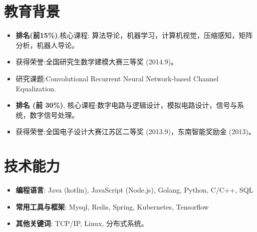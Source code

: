 \documentclass{resume}
\begin{document}
\section{教育背景}
\begin{itemize}
  \item \textbf{排名(前15\%)},核心课程: 算法导论，机器学习，计算机视觉，压缩感知，矩阵分析，机器人导论。
  \item 获得荣誉:全国研究生数学建模大赛三等奖 (2014.9)。
  \item 研究课题:Convolutional Recurrent Neural Network-based Channel Equalization.
\end{itemize}

\begin{itemize}
  \item \textbf{排名 (前 30\%)}, 核心课程:数字电路与逻辑设计，模拟电路设计，信号与系统，数字信号处理。
  \item 获得荣誉:全国电子设计大赛江苏区二等奖 (2013.9)，东南智能奖励金 (2013)。
\end{itemize}

\section{技术能力}
\begin{itemize}[parsep=0.2ex]
  \item \textbf{编程语言}: Java (kotlin), JavaScript (Node.js), Golang, Python, C/C++, SQL 
  \item \textbf{常用工具与框架}: Mysql, Redis, Spring, Kubernetes, Tensorflow
  \item \textbf{其他关键词}: TCP/IP, Linux, 分布式系统。
\end{itemize}
\end{document}
